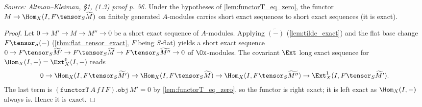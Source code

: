 
\begin{lemma}

\leanok
[Exactness of $M \mapsto \Hom_X(I, F \tensor_S \widetilde M)$ from $T = 0$]
  \label{lem:homTensorFunctor_tilde_exact}
  \textit{Source: Altman--Kleiman, §1, (1.3) proof p. 56.}
  Under the hypotheses of \cref{lem:functorT_eq_zero}, the functor
  $M \mapsto \Hom_X(I, F \tensor_S \widetilde M)$ on finitely generated
  $A$-modules carries short exact sequences to short exact sequences (it is exact).
  \begin{proof}
    Let $0 \to M' \to M \to M'' \to 0$ be a short exact sequence of $A$-modules.
    Applying $\widetilde{(-)}$ (\cref{lem:tilde_exact}) and the flat base change
    $F \tensor_S (-)$ (\cref{thm:flat_tensor_exact}, $F$ being $S$-flat) yields a
    short exact sequence
    $0 \to F\tensor_S\widetilde{M'} \to F\tensor_S\widetilde M \to
    F\tensor_S\widetilde{M''} \to 0$ of $\Ox$-modules. The covariant $\Ext$ long
    exact sequence for $\Hom_X(I, -) = \Ext^0_X(I, -)$ reads
    \[
      0 \to \Hom_X(I, F\tensor_S\widetilde{M'}) \to
      \Hom_X(I, F\tensor_S\widetilde M) \to
      \Hom_X(I, F\tensor_S\widetilde{M''}) \to
      \Ext^1_X(I, F\tensor_S\widetilde{M'}).
    \]
    The last term is $(\texttt{functorT}\,A\,f\,I\,F).\mathtt{obj}\,M' = 0$ by
    \cref{lem:functorT_eq_zero}, so the functor is right exact; it is left exact as
    $\Hom_X(I,-)$ always is. Hence it is exact.
  \end{proof}
\end{lemma}

